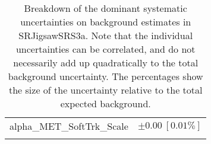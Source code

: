 \begin{table}
\begin{center}
\begin{tabular*}{\textwidth}{@{\extracolsep{\fill}}lc}
alpha\_MET\_SoftTrk\_Scale         & $\pm 0.00\ [0.01\%] $       \\
\noalign{\smallskip}\hline\noalign{\smallskip}
\end{tabular*}
\end{center}
\caption[Breakdown of uncertainty on background estimates]{
Breakdown of the dominant systematic uncertainties on background estimates in SRJigsawSRS3a.
Note that the individual uncertainties can be correlated, and do not necessarily add up quadratically to 
the total background uncertainty. The percentages show the size of the uncertainty relative to the total expected background.
\label{table.results.bkgestimate.uncertainties.SRJigsawSRS3a}}
\end{table}
%